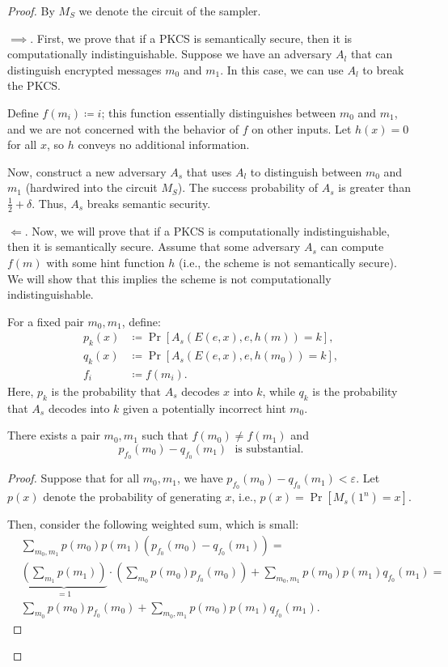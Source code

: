 \begin{proof}
	By $M_S$ we denote the circuit of the sampler.

	$\implies$. First, we prove that if a PKCS is semantically secure, then it is computationally indistinguishable.
	Suppose we have an adversary $A_l$ that can distinguish encrypted messages $m_0$ and $m_1$.
	In this case, we can use $A_l$ to break the PKCS.

	Define $f(m_i) \coloneqq i$; this function essentially distinguishes between $m_0$ and $m_1$, and we are not concerned with the behavior of $f$ on other inputs.
	Let $h(x) = 0$ for all $x$, so $h$ conveys no additional information.

	Now, construct a new adversary $A_s$ that uses $A_l$ to distinguish between $m_0$ and $m_1$ (hardwired into the circuit $M_S$).
	The success probability of $A_s$ is greater than $\frac{1}{2} + \delta$.
	Thus, $A_s$ breaks semantic security.

	$\Longleftarrow$. Now, we will prove that if a PKCS is computationally indistinguishable, then it is semantically secure.
	Assume that some adversary $A_s$ can compute $f(m)$ with some hint function $h$ (i.e., the scheme is not semantically secure).
	We will show that this implies the scheme is not computationally indistinguishable.

	For a fixed pair $m_0, m_1$, define:
	\begin{align*}
		p_k(x) &\coloneqq \Pr[A_s(E(e, x), e, h(m)) = k], \\
		q_k(x) &\coloneqq \Pr[A_s(E(e, x), e, h(m_0)) = k], \\
		f_i &\coloneqq f(m_i).
	\end{align*}
	Here, $p_k$ is the probability that $A_s$ decodes $x$ into $k$, while $q_k$ is the probability that $A_s$ decodes into $k$ given a potentially incorrect hint $m_0$.

	\begin{lemma}
		There exists a pair $m_0, m_1$ such that $f(m_0) \neq f(m_1)$ and 
		\[
			p_{f_0}(m_0) - q_{f_0}(m_1) \text{ ~is substantial}.
		\] 
	\end{lemma}

	\begin{proof}
		Suppose that for all $m_0, m_1$, we have $p_{f_0}(m_0) - q_{f_0}(m_1) < \varepsilon$.
		Let $p(x)$ denote the probability of generating $x$, i.e., $p(x) = \Pr[M_s(1^{n}) = x]$.

		Then, consider the following weighted sum, which is small:
		\begin{align*}
			&\sum_{m_0, m_1} p(m_0) p(m_1) (p_{f_0}(m_0) - q_{f_0}(m_1)) = \\
			&\underbrace{\left(\sum_{m_1} p(m_1)\right)}_{=1} \cdot \left(\sum_{m_0} p(m_0) p_{f_0}(m_0)\right) + \sum_{m_0, m_1} p(m_0) p(m_1) q_{f_0}(m_1) = \\
			&\sum_{m_0} p(m_0) p_{f_0}(m_0) + \sum_{m_0, m_1} p(m_0) p(m_1) q_{f_0}(m_1).
		\end{align*}


\end{proof}
\end{proof}
